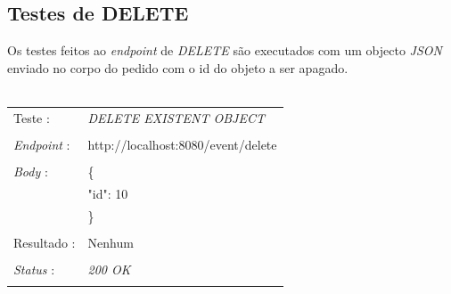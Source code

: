 \subsection{Testes de DELETE}\label{514}
Os testes feitos ao \emph{endpoint} de \emph{DELETE} são executados com um objecto \emph{JSON} enviado no corpo do pedido com o id do objeto a ser apagado.\\
\\
\begin{tabular}{ll}
	Teste : & \emph{DELETE EXISTENT OBJECT}\\
	\\
	\emph{Endpoint} : & http://localhost:8080/event/delete\\
	\\
	\emph{Body} : & \{ \\
	& "id": 10 \\
	& \} \\
	\\
	Resultado : & Nenhum\\
	\\
	\emph{Status} : & \emph{200 OK}\\
	\\
\end{tabular}

